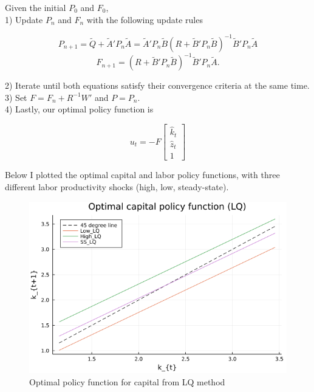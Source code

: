 \documentclass{article}
\begin{document}
	 Given the initial $P_{0}$ and $F_{0}$, \\
	 
	 1) Update $P_{n}$ and $F_{n}$ with the following update rules
	 
	 $$P_{n+1} = \tilde{Q} + \tilde{A}'P_{n}\tilde{A} = \tilde{A}'P_{n}\tilde{B}(R + \tilde{B}'P_{n}\tilde{B})^{-1}\tilde{B}'P_{n}\tilde{A}$$
	 $$F_{n+1} = (R + \tilde{B}'P_{n}\tilde{B})^{-1}\tilde{B}'P_{n}\tilde{A}.$$
	 
	 2) Iterate until both equations satisfy their convergence criteria at the same time. \\
	 
	 3) Set $F = F_{n} + R^{-1}W'$ and $P = P_{n}$. \\
	 
	 4) Lastly, our optimal policy function is 
	 
	 $$u_{t} = -F\begin{bmatrix} \hat{k}_{t} \\ \hat{z}_{t} \\ 1  \end{bmatrix}$$
	 
	 Below I plotted the optimal capital and labor policy functions, with three different labor productivity shocks (high, low, steady-state). \\
	 
	 \begin{figure}[htbp]
		\centering
		\includegraphics[scale=0.5]{kpol_LQ.png}
		\caption{Optimal policy function for capital from LQ method}
	\end{figure}
	
\end{document}
